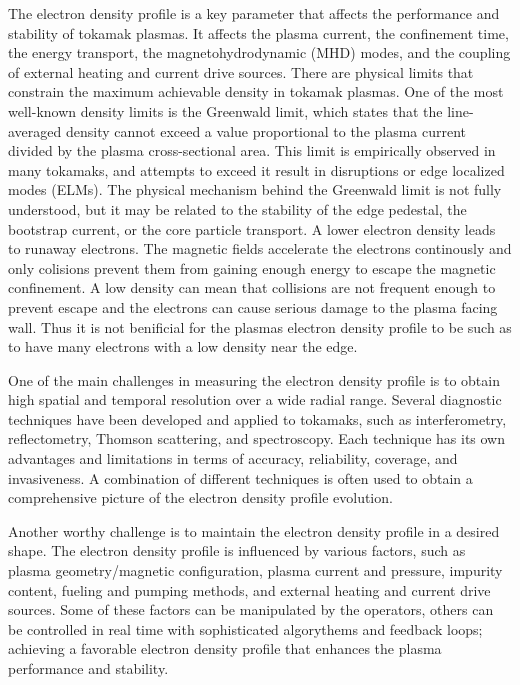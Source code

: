 The electron density profile is a key parameter that affects the performance and stability of tokamak plasmas. It affects the plasma current, the confinement time, the energy transport, the magnetohydrodynamic (MHD) modes, and the coupling of external heating and current drive sources. There are physical limits that constrain the maximum achievable density in tokamak plasmas. One of the most well-known density limits is the Greenwald limit, which states that the line-averaged density cannot exceed a value proportional to the plasma current divided by the plasma cross-sectional area. This limit is empirically observed in many tokamaks, and attempts to exceed it result in disruptions or edge localized modes (ELMs). The physical mechanism behind the Greenwald limit is not fully understood, but it may be related to the stability of the edge pedestal, the bootstrap current, or the core particle transport. A lower electron density leads to runaway electrons. The magnetic fields accelerate the electrons continously and only colisions prevent them from gaining enough energy to escape the magnetic confinement. A low density can mean that collisions are not frequent enough to prevent escape and the electrons can cause serious damage to the plasma facing wall. Thus it is not benificial for the plasmas electron density profile to be such as to have many electrons with a low density near the edge. 

One of the main challenges in measuring the electron density profile is to obtain high spatial and temporal resolution over a wide radial range. Several diagnostic techniques have been developed and applied to tokamaks, such as interferometry, reflectometry, Thomson scattering, and spectroscopy. Each technique has its own advantages and limitations in terms of accuracy, reliability, coverage, and invasiveness. A combination of different techniques is often used to obtain a comprehensive picture of the electron density profile evolution.

Another worthy challenge is to maintain the electron density profile in a desired shape. The electron density profile is influenced by various factors, such as plasma geometry/magnetic configuration, plasma current and pressure, impurity content, fueling and pumping methods, and external heating and current drive sources. Some of these factors can be manipulated by the operators, others can be controlled in real time with sophisticated algorythems and feedback loops; achieving a favorable electron density profile that enhances the plasma performance and stability.

